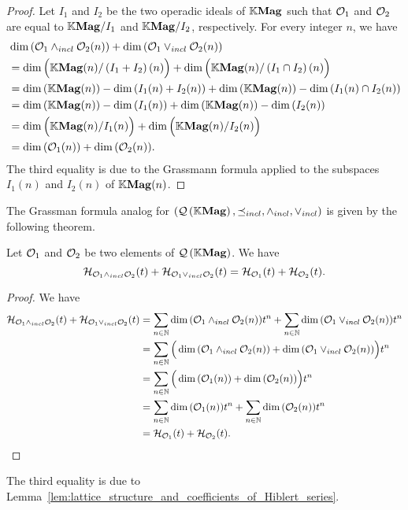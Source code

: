 \begin{proof}
  Let $I_1$ and $I_2$ be the two operadic ideals of $\mathbb{K}\mathbf{Mag}$ such that
  $\mathcal{O}_1$ and $\mathcal{O}_2$ are equal to $\mathbb{K}\mathbf{Mag}/I_1$ and $\mathbb{K}\mathbf{Mag}/I_2$,
  respectively. For every integer $n$, we have
  \[\begin{split}
  &\dim{\left(\mathcal{O}_1\wedge_{incl}\mathcal{O}_2(n)\right)}+
  \dim{\left(\mathcal{O}_1\vee_{incl}\mathcal{O}_2(n)\right)}\\
  &=\dim{\Big(\mathbb{K}\mathbf{Mag}(n)/\left(I_1+I_2\right)(n)\Big)}+
  \dim{\Big(\mathbb{K}\mathbf{Mag}(n)/\left(I_1\cap I_2\right)(n)\Big)}\\
  &=\dim{\left(\mathbb{K}\mathbf{Mag}(n)\right)}-\dim{\left(I_1(n)+I_2(n)\right)}
  +\dim{\left(\mathbb{K}\mathbf{Mag}(n)\right)}-\dim{\left(I_1(n)\cap I_2(n)\right)}\\
  &=\dim{\left(\mathbb{K}\mathbf{Mag}(n)\right)}-\dim{\left(I_1(n)\right)}+
  \dim{\left(\mathbb{K}\mathbf{Mag}(n)\right)}-\dim{\left(I_2(n)\right)}\\
  &=\dim{\Big(\mathbb{K}\mathbf{Mag}(n)/I_1(n)\Big)}+\dim{\Big(\mathbb{K}\mathbf{Mag}(n)/I_2(n)\Big)}\\
  &=\dim{\left(\mathcal{O}_1(n)\right)}+\dim{\left(\mathcal{O}_2(n)\right)}.
  \end{split}\]
  The third equality is due to the Grassmann formula applied to the
  subspaces $I_1(n)$ and $I_2(n)$ of $\mathbb{K}\mathbf{Mag}(n)$.
\end{proof}

The Grassman formula analog for $\left(\mathcal{Q}\left(\mathbb{K}\mathbf{Mag}\right),\preceq_{incl},\wedge_{incl},\vee_{incl}\right)$ is given by the following
theorem.

\begin{Theorem} \label{thm:Grassmann_formula_for__Hilbert_series_of_QMag}
  Let $\mathcal{O}_1$ and $\mathcal{O}_2$ be two elements of $\mathcal{Q}\left(\mathbb{K}\mathbf{Mag}\right)$. We have
  \begin{equation} \label{equ:lattice_structure_and_Hiblert_series}
    \mathcal{H}_{\mathcal{O}_1\wedge_{incl}\mathcal{O}_2}(t)+\mathcal{H}_{\mathcal{O}_1\vee_{incl}\mathcal{O}_2}(t)=\mathcal{H}_{\mathcal{O}_1}(t)+\mathcal{H}_{\mathcal{O}_2}(t).
    \end{equation}
  \end{Theorem}

\begin{proof}
  We have
  \[\begin{split}
  \mathcal{H}_{\mathcal{O}_1\wedge_{incl}\mathcal{O}_2}(t)+\mathcal{H}_{\mathcal{O}_1\vee_{incl}\mathcal{O}_2}(t)&=\sum_{n\in\mathbb{N}}\dim{\left(\mathcal{O}_1\wedge_{incl}\mathcal{O}_2(n)\right)}t^n+\sum_{n\in\mathbb{N}}\dim{\left(\mathcal{O}_1\vee_{incl}\mathcal{O}_2(n)\right)}t^n\\
  &=\sum_{n\in\mathbb{N}}\Big(\dim{\left(\mathcal{O}_1\wedge_{incl}\mathcal{O}_2(n)\right)}+\dim{\left(\mathcal{O}_1\vee_{incl}\mathcal{O}_2(n)\right)}\Big)t^n\\
  &=\sum_{n\in\mathbb{N}}\Big(\dim{\left(\mathcal{O}_1(n)\right)}+\dim{\left(\mathcal{O}_2(n)\right)}\Big)t^n\\
  &=\sum_{n\in\mathbb{N}}\dim{\left(\mathcal{O}_1(n)\right)}t^n+\sum_{n\in\mathbb{N}}\dim{\left(\mathcal{O}_2(n)\right)}t^n\\
  &=\mathcal{H}_{\mathcal{O}_1}(t)+\mathcal{H}_{\mathcal{O}_2}(t).
  \end{split}\]
\end{proof}
The third equality is due to Lemma~\ref{lem:lattice_structure_and_coefficients_of_Hiblert_series}.

